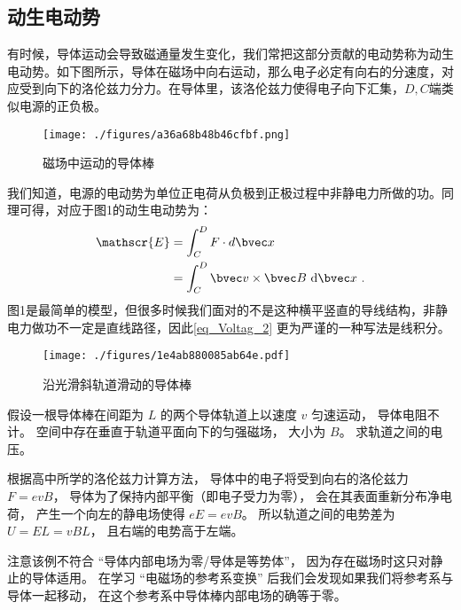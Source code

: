 \subsection{动生电动势}
有时候，导体运动会导致磁通量发生变化，我们常把这部分贡献的电动势称为动生电动势。如下图所示，导体在磁场中向右运动，那么电子必定有向右的分速度，对应受到向下的洛伦兹力分力。在导体里，该洛伦兹力使得电子向下汇集，$D,C$端类似电源的正负极。
\begin{figure}[ht]
\centering
\texttt{[image: ./figures/a36a68b48b46cfbf.png]}
\caption{磁场中运动的导体棒} \label{fig_Voltag_2}
\end{figure}
我们知道，电源的电动势为单位正电荷从负极到正极过程中非静电力所做的功。同理可得，对应于图1的动生电动势为：
\begin{equation}\label{eq_Voltag_2}
\begin{aligned}
\mathscr{E}&=\int_{C}^D F\cdot d\bvec x\\
&=\int_{C}^{D} \bvec  v\times \bvec B \mathrm{~d} \bvec x ~.
\end{aligned}
\end{equation}
图1是最简单的模型，但很多时候我们面对的不是这种横平竖直的导线结构，非静电力做功不一定是直线路径，因此\autoref{eq_Voltag_2} 更为严谨的一种写法是线积分。
\begin{example}{}
\begin{figure}[ht]
\centering
\texttt{[image: ./figures/1e4ab880085ab64e.pdf]}
\caption{沿光滑斜轨道滑动的导体棒} \label{fig_Voltag_1}
\end{figure}
假设一根导体棒在间距为 $L$ 的两个导体轨道上以速度 $v$ 匀速运动， 导体电阻不计。 空间中存在垂直于轨道平面向下的匀强磁场， 大小为 $B$。 求轨道之间的电压。

根据高中所学的洛伦兹力计算方法， 导体中的电子将受到向右的洛伦兹力 $F = evB$， 导体为了保持内部平衡（即电子受力为零）， 会在其表面重新分布净电荷， 产生一个向左的静电场使得 $eE = evB$。 所以轨道之间的电势差为 $U = EL = vBL$， 且右端的电势高于左端。
\end{example}

注意该例不符合 “导体内部电场为零/导体是等势体”， 因为存在磁场时这只对静止的导体适用。 在学习 “电磁场的参考系变换” 后我们会发现如果我们将参考系与导体一起移动， 在这个参考系中导体棒内部电场的确等于零。
